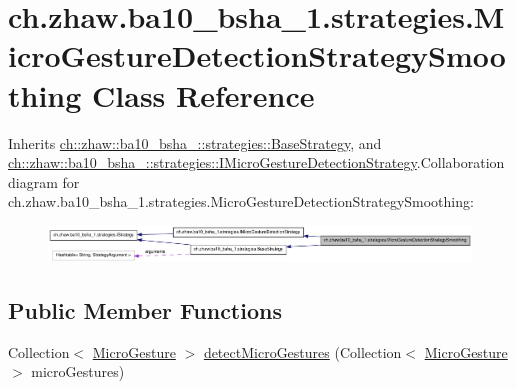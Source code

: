 \hypertarget{classch_1_1zhaw_1_1ba10__bsha__1_1_1strategies_1_1MicroGestureDetectionStrategySmoothing}{
\section{ch.zhaw.ba10\_\-bsha\_\-1.strategies.MicroGestureDetectionStrategySmoothing Class Reference}
\label{classch_1_1zhaw_1_1ba10__bsha__1_1_1strategies_1_1MicroGestureDetectionStrategySmoothing}
}


Inherits \hyperlink{classch_1_1zhaw_1_1ba10__bsha__1_1_1strategies_1_1BaseStrategy}{ch::zhaw::ba10\_\-bsha\_::strategies::BaseStrategy}, and \hyperlink{interfacech_1_1zhaw_1_1ba10__bsha__1_1_1strategies_1_1IMicroGestureDetectionStrategy}{ch::zhaw::ba10\_\-bsha\_::strategies::IMicroGestureDetectionStrategy}.Collaboration diagram for ch.zhaw.ba10\_\-bsha\_\-1.strategies.MicroGestureDetectionStrategySmoothing:\nopagebreak
\begin{figure}[H]
\begin{center}
\leavevmode
\includegraphics[width=400pt]{classch_1_1zhaw_1_1ba10__bsha__1_1_1strategies_1_1MicroGestureDetectionStrategySmoothing__coll__graph}
\end{center}
\end{figure}
\subsection*{Public Member Functions}
\begin{DoxyCompactItemize}
\item 
Collection$<$ \hyperlink{classch_1_1zhaw_1_1ba10__bsha__1_1_1service_1_1MicroGesture}{MicroGesture} $>$ \hyperlink{classch_1_1zhaw_1_1ba10__bsha__1_1_1strategies_1_1MicroGestureDetectionStrategySmoothing_acdb5b6b2bb7ad9f48c79b88770113f45}{detectMicroGestures} (Collection$<$ \hyperlink{classch_1_1zhaw_1_1ba10__bsha__1_1_1service_1_1MicroGesture}{MicroGesture} $>$ microGestures)
\end{DoxyCompactItemize}
